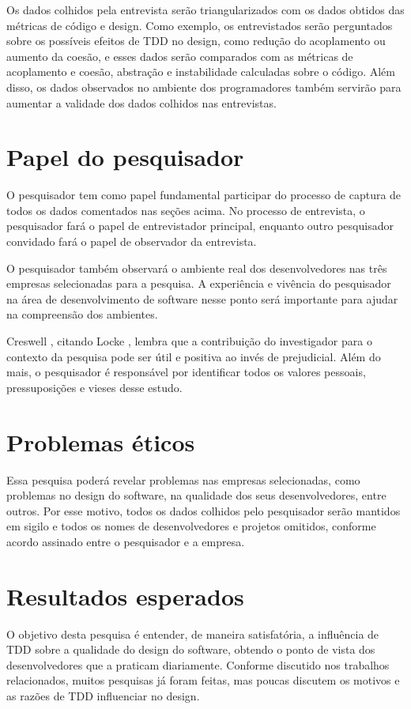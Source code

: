 Os dados colhidos pela entrevista serão triangularizados com os dados obtidos das métricas de código e design. 
Como exemplo, os entrevistados serão perguntados sobre os possíveis efeitos de TDD no design, como redução do acoplamento ou
aumento da coesão, e esses dados serão comparados com as métricas de acoplamento e coesão, abstração e instabilidade 
calculadas sobre o código.
Além disso, os dados observados no ambiente dos programadores também servirão para aumentar a validade dos 
dados colhidos nas entrevistas.

\section{Papel do pesquisador}
\label{sec:planejamento-papel}

O pesquisador tem como papel fundamental participar do processo de captura de todos os dados comentados
nas seções acima. No processo de entrevista, o pesquisador fará o papel de entrevistador principal, enquanto outro
pesquisador convidado fará o papel de observador da entrevista.

O pesquisador também observará o ambiente real dos desenvolvedores nas três empresas selecionadas
para a pesquisa. A experiência e vivência do pesquisador na área de desenvolvimento de software 
nesse ponto será importante para ajudar na compreensão dos ambientes. 

Creswell \cite{creswell}, citando Locke \cite{locke}, lembra
que a contribuição do investigador para o contexto da pesquisa pode ser útil e positiva ao invés de prejudicial.
Além do mais, o pesquisador é responsável por identificar todos os valores pessoais, pressuposições e vieses desse estudo.

\section{Problemas éticos}
\label{sec:planejamento-etica}

Essa pesquisa poderá revelar problemas nas empresas selecionadas, como problemas no design do software, na
qualidade dos seus desenvolvedores, entre outros. Por esse motivo, todos os dados colhidos pelo pesquisador
serão mantidos em sigilo e todos os nomes de desenvolvedores e projetos omitidos, conforme acordo assinado entre o pesquisador e a empresa.


\section{Resultados esperados}
\label{sec:planejamento-resultados-esperados}

O objetivo desta pesquisa é entender, de maneira satisfatória, a influência de TDD sobre a qualidade
do design do software, obtendo o ponto de vista dos desenvolvedores que a praticam diariamente. 
Conforme discutido nos trabalhos relacionados, muitos pesquisas já foram feitas, 
mas poucas discutem os motivos e as razões de TDD influenciar no design.


